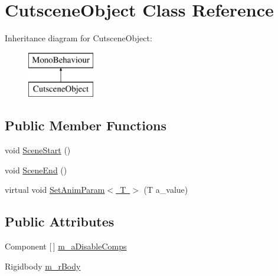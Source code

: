 \hypertarget{class_cutscene_object}{}\section{Cutscene\+Object Class Reference}
\label{class_cutscene_object}
Inheritance diagram for Cutscene\+Object\+:\begin{figure}[H]
\begin{center}
\leavevmode
\includegraphics[height=2.000000cm]{class_cutscene_object}
\end{center}
\end{figure}
\subsection*{Public Member Functions}
\begin{DoxyCompactItemize}
\item 
void \mbox{\hyperlink{class_cutscene_object_a041b232f8146038cc625120e1cab138d}{Scene\+Start}} ()
\item 
void \mbox{\hyperlink{class_cutscene_object_ad3f71206703f9912e26b3c007259d4fb}{Scene\+End}} ()
\item 
virtual void \mbox{\hyperlink{class_cutscene_object_a8d23d6fb5601379ba729b3aa9292003c}{Set\+Anim\+Param$<$ T $>$}} (T a\+\_\+value)
\end{DoxyCompactItemize}
\subsection*{Public Attributes}
\begin{DoxyCompactItemize}
\item 
Component \mbox{[}$\,$\mbox{]} \mbox{\hyperlink{class_cutscene_object_aa2ce9bca249dae951b4b6f93abfec624}{m\+\_\+a\+Disable\+Comps}}
\item 
Rigidbody \mbox{\hyperlink{class_cutscene_object_a0f2d7168764e754d26214b5631f29193}{m\+\_\+r\+Body}}
\end{DoxyCompactItemize}
